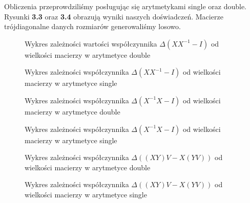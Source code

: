 Obliczenia przeprowdziliśmy posługując się arytmetykami single oraz double. Rysunki \textbf{3.3} oraz \textbf{3.4} obrazują wyniki naszych doświadczeń. Macierze trójdiagonalne danych rozmiarów generowaliśmy losowo. 
\begin{figure}[hb]
\begin{center}

\caption{Wykres zależności wartości współczynnika $\Delta(XX^{-1}-I)$ od wielkości macierzy w arytmetyce double}
\end{center}
\end{figure}
\begin{figure}[hb]
\begin{center}

\caption{Wykres zależności współczynnika $\Delta(XX^{-1}-I)$ od wielkości macierzy w arytmetyce single}
\end{center}
\end{figure}
\begin{figure}[hb]
\begin{center}

\caption{Wykres zależności współczynnika $\Delta(X^{-1}X-I)$ od wielkości macierzy w arytmetyce double}
\end{center}
\end{figure}
\begin{figure}
\begin{center}

\caption{Wykres zależności współczynnika $\Delta(X^{-1}X-I)$ od wielkości macierzy w arytmetyce single}
\end{center}
\end{figure}
\begin{figure}
\begin{center}

\caption{Wykres zależności współczynnika $\Delta((XY)V-X(YV))$ od wielkości macierzy w arytmetyce double}
\end{center}
\end{figure}
\begin{figure}
\begin{center}

\caption{Wykres zależności współczynnika $\Delta((XY)V-X(YV))$ od wielkości macierzy w arytmetyce single}
\end{center}
\end{figure}
